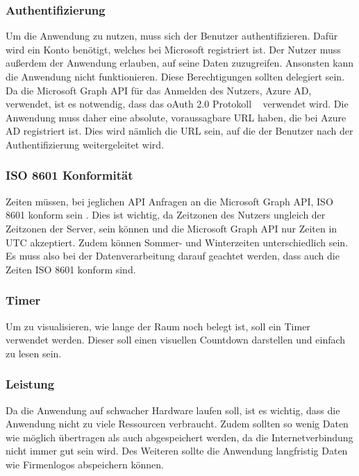 \subsubsection{Authentifizierung}\label{subsubsec:authentifizierung}
Um die Anwendung zu nutzen, muss sich der Benutzer authentifizieren.
Dafür wird ein Konto benötigt, welches bei Microsoft registriert ist.
Der Nutzer muss außerdem der Anwendung erlauben, auf seine Daten zuzugreifen.
Ansonsten kann die Anwendung nicht funktionieren.
Diese Berechtigungen sollten delegiert sein.
Da die Microsoft Graph API für das Anmelden des Nutzers, Azure AD, verwendet, ist es notwendig, dass das oAuth 2.0 Protokoll ~\cite{OAuth-2.0-Simplified} verwendet wird.
Die Anwendung muss daher eine absolute, voraussagbare URL haben, die bei Azure AD registriert ist.
Dies wird nämlich die URL sein, auf die der Benutzer nach der Authentifizierung weitergeleitet wird.
\subsubsection{ISO 8601 Konformität}\label{subsubsec:iso-8601-konformitaet}
Zeiten müssen, bei jeglichen API Anfragen an die Microsoft Graph API, ISO 8601 konform sein \@.
Dies ist wichtig, da Zeitzonen des Nutzers ungleich der Zeitzonen der Server, sein können und die Microsoft Graph API nur Zeiten in UTC akzeptiert.
Zudem können Sommer- und Winterzeiten unterschiedlich sein.
Es muss also bei der Datenverarbeitung darauf geachtet werden, dass auch die Zeiten ISO 8601 konform sind.
\subsubsection{Timer}\label{subsubsec:timer}
Um zu visualisieren, wie lange der Raum noch belegt ist, soll ein Timer verwendet werden.
Dieser soll einen visuellen Countdown darstellen und einfach zu lesen sein.
\subsubsection{Leistung}\label{subsubsec:leistung}
Da die Anwendung auf schwacher Hardware laufen soll, ist es wichtig, dass die Anwendung nicht zu viele Ressourcen verbraucht.
Zudem sollten so wenig Daten wie möglich übertragen als auch abgespeichert werden, da die Internetverbindung nicht immer gut sein wird.
Des Weiteren sollte die Anwendung langfristig Daten wie Firmenlogos abspeichern können.

